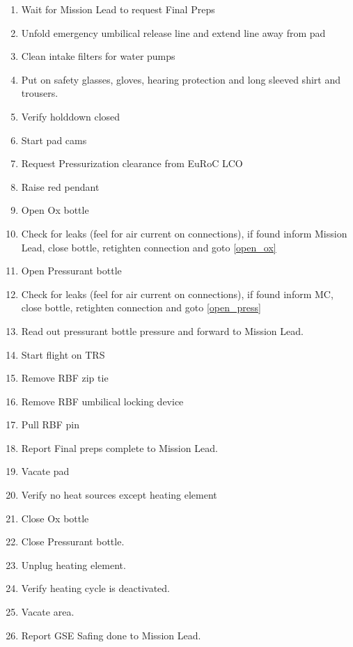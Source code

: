 \begin{enumerate}[label=P\arabic*.]
    \item \label{pad_final_preps_start} Wait for Mission Lead to request Final Preps\checkbox
    \item Unfold emergency umbilical release line and extend \newline line away from pad \checkbox
    \item Clean intake filters for water pumps \checkbox
    \item Put on safety glasses, gloves, hearing protection and long sleeved shirt and trousers.\checkbox
    \item Verify holddown closed\checkbox
    \item Start pad cams\checkbox
    \item Request Pressurization clearance from EuRoC LCO\checkbox
    \item Raise red pendant\checkbox
    \item \label{open_ox} Open Ox bottle\checkbox
    \item Check for leaks (feel for air current on connections), if found inform Mission Lead, close bottle, retighten connection and goto \ref{open_ox}\checkbox
    \item \label{open_press} Open Pressurant bottle\checkbox
    \item Check for leaks (feel for air current on connections), if found inform MC, close bottle, retighten connection and goto \ref{open_press}\checkbox
    \item Read out pressurant bottle pressure and forward to Mission Lead.\checkbox
    \item Start flight on TRS\checkbox
    \item Remove RBF zip tie \checkbox
    \item Remove RBF umbilical locking device \checkbox
    \item Pull RBF pin\checkbox
    \item Report Final preps complete to Mission Lead.\checkbox
    \item \label{vacate_pad} Vacate pad\checkbox
    
    \item \label{pad_gse_safing_start} Verify no heat sources except heating element\checkbox
    \item Close Ox bottle\checkbox
    \item Close Pressurant bottle.\checkbox
    \item Unplug heating element.\checkbox
    \item Verify heating cycle is deactivated.\checkbox
    \item \label{pad_gse_safing_end} Vacate area.\checkbox
    \item Report GSE Safing done to Mission Lead.\checkbox

    
\label{end_section_pressurant}
\end{enumerate}